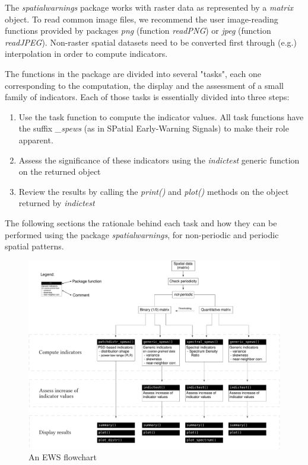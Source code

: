 \documentclass{article}
\begin{document}

The \emph{spatialwarnings} package works with raster data as represented by a 
\emph{matrix} object. To read common image files, we recommend the user 
image-reading functions provided by packages \emph{png} (function \emph{readPNG}) 
or \emph{jpeg} (function \emph{readJPEG}). Non-raster spatial datasets need to 
be converted first through (e.g.) interpolation in order to compute indicators.

The functions in the package are divided into several "tasks", each one 
corresponding to the computation, the display and the assessment of a 
small family of indicators. Each of those tasks is essentially divided into 
three steps: 
  
  \begin{enumerate}
    \item Use the task function to compute the indicator values. All task 
      functions have the suffix \emph{\_spews} (as in SPatial Early-Warning 
      Signals) to make their role apparent. 
    
    \item Assess the significance of these indicators using the \emph{indictest}
      generic function on the returned object
      
    \item Review the results by calling the \emph{print()} and \emph{plot()} 
      methods on the object returned by \emph{indictest}

  \end{enumerate}

The following sections the rationale behind each task and how they can be 
performed using the package \emph{spatialwarnings}, for non-periodic and 
periodic spatial patterns. 

\begin{figure}
  \centering
  \includegraphics[width=1\textwidth]{./figures/flowchart.pdf}
  \caption{An EWS flowchart}
  \label{fig:flowchart}
\end{figure}
\end{document}
